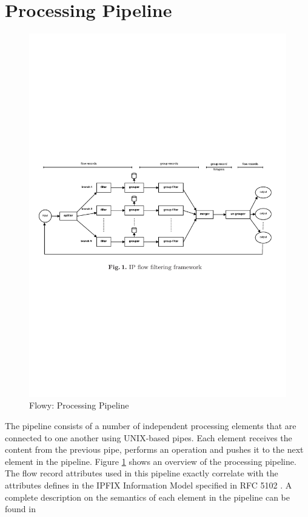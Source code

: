 \section{Processing Pipeline}\label{sec:processing-pipeline}
\begin{figure}[h!]	
\begin{center}
  \includegraphics* [width=1.0\linewidth]{figures/flowy-pipeline}	
  \caption{Flowy: Processing Pipeline \cite{vmarinov:2009}}
  \label{fig:flowy-pipeline}
\end{center}
\end{figure}
The pipeline consists of a number of independent processing elements that are connected to one another using UNIX-based pipes. Each element receives the content from the previous pipe, performs an operation and pushes it to the next element in the pipeline. Figure \ref{fig:flowy-pipeline} shows an overview of the processing pipeline. The flow record attributes used in this pipeline exactly correlate with the attributes defines in the \ac{IPFIX} Information Model specified in RFC 5102 \cite{rfc5102}. A complete description on the semantics of each element in the pipeline can be found in \cite{vmarinov:thesis:2009}

